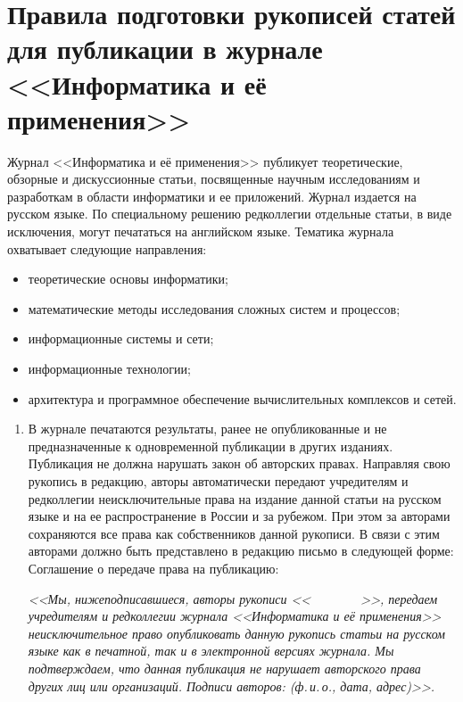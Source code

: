 \vspace*{-60pt} {\small
{\baselineskip=9.1pt
\section*{Правила подготовки рукописей статей для публикации в журнале
<<Информатика и её применения>>}

\thispagestyle{empty}

 Журнал <<Информатика и её применения>> публикует
теоретические, обзорные и дискуссионные статьи, посвященные научным
исследованиям и разработкам в области информатики и ее приложений. Журнал
издается на русском языке. По специальному решению редколлегии отдельные статьи,
в виде исключения, могут печататься на английском языке.
Тематика журнала охватывает следующие направления:
\begin{itemize}
\item теоретические основы информатики; %
\item математические методы исследования сложных систем и процессов; %
\item информационные системы и сети; %
\item информационные технологии; %
\item архитектура и программное
обеспечение вычислительных комплексов и сетей.
\end{itemize}
\begin{enumerate}
\item В журнале печатаются результаты, ранее не
опубликованные и не предназначенные к одновременной публикации в других
изданиях. Публикация не должна нарушать закон об авторских правах. Направляя
свою рукопись в редакцию, авторы автоматически передают учредителям и
редколлегии неисключительные права на издание данной статьи на русском языке и
на ее распространение в России и за рубежом. При этом за авторами сохраняются
все права как собственников данной рукописи. В связи с этим авторами должно
быть представлено в редакцию письмо в следующей форме:
Соглашение о передаче права на публикацию:

\textit{<<Мы, нижеподписавшиеся, авторы рукописи <<$\qquad\qquad$>>, передаем
учредителям и редколлегии журнала <<Информатика и её применения>>
неисключительное право опубликовать данную рукопись статьи на русском языке как
в печатной, так и в электронной версиях журнала. Мы подтверждаем, что данная
публикация не нарушает авторского права других лиц или организаций. Подписи
авторов: (ф.\,и.\,о., дата, адрес)>>.}


\end{enumerate}}}
